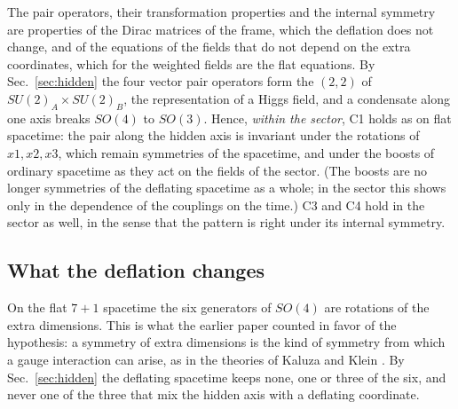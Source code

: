The pair operators, their transformation properties and the internal symmetry are properties of the
Dirac matrices of the frame, which the deflation does not change, and of the equations of the fields
that do not depend on the extra coordinates, which for the weighted fields are the flat equations.
By Sec.~\ref{sec:hidden} the four vector pair operators form the $(2,2)$ of
$SU(2)_A\times SU(2)_B$, the representation of a Higgs field, and a condensate along one axis breaks
$SO(4)$ to $SO(3)$. Hence, \emph{within the sector}, C1 holds as on flat spacetime: the pair along
the hidden axis is invariant under the rotations of $x1,x2,x3$, which remain symmetries of the
spacetime, and under the boosts of ordinary spacetime as they act on the fields of the sector. (The
boosts are no longer symmetries of the deflating spacetime as a whole; in the sector this shows only
in the dependence of the couplings on the time.) C3 and C4 hold in the sector as well, in the sense
that the pattern is right under its internal symmetry.

\subsection{What the deflation changes}

On the flat $7+1$ spacetime the six generators of $SO(4)$ are rotations of the extra dimensions. This
is what the earlier paper counted in favor of the hypothesis: a symmetry of extra dimensions is the
kind of symmetry from which a gauge interaction can arise, as in the theories of Kaluza and Klein
\cite{Witten1981}. By Sec.~\ref{sec:hidden} the deflating spacetime keeps none, one or three of the
six, and never one of the three that mix the hidden axis with a deflating coordinate.

